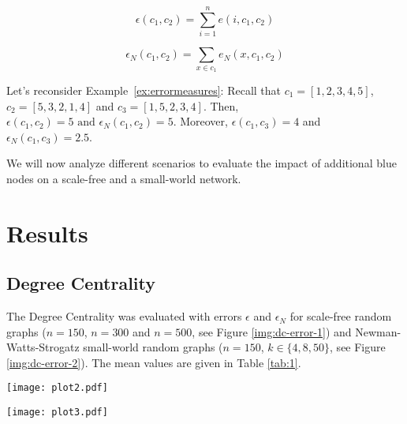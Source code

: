 \[\epsilon(c_1, c_2)= \sum_{i=1}^n e(i,c_1, c_2)\]

\[\epsilon_N(c_1, c_2)= \sum_{x \in c_1} e_N(x,c_1, c_2)\]

\begin{exl}
	Let's reconsider Example~\ref{ex:errormeasures}: 
	Recall that $c_1 = [1,2,3,4,5]$, $c_2=[5,3,2,1,4]$ and $c_3=[1,5,2,3,4]$. 
	Then, $\epsilon(c_1,c_2)=5 \text{ and } \epsilon_{N}(c_1,c_2)=5.$  
	Moreover, $\epsilon(c_1,c_3)=4$ and 
	$\epsilon_{N}(c_1,c_3)=2.5$.
\end{exl}

We will now analyze different scenarios to evaluate the impact of additional blue nodes on a scale-free and a small-world network.

\section{Results}

\subsection{Degree Centrality}

The Degree Centrality was evaluated with errors $\epsilon$ and $\epsilon_N$ for scale-free random graphs ($n=150$, $n=300$ and $n=500$, see Figure \ref{img:dc-error-1}) and Newman-Watts-Strogatz small-world random graphs ($n=150$, $k\in\{4,8,50\}$, see Figure \ref{img:dc-error-2}). The mean values are given in Table \ref{tab:1}.

\begin{figure*}[t] %
	\centering
	\texttt{[image: plot2.pdf]}
	\caption{Degree Centrality errors for scale-free random graphs ($n=150$, $n=300$ and $n=500$) for different values of $p_B$ between 0 and~0.3. }

	\label{img:dc-error-1}

	\centering
	\texttt{[image: plot3.pdf]}
	\caption{Degree Centrality errors for Newman-Watts-Strogatz small-world random graph ($n=150$, $k\in\{4,8,50\}$) for different values of $p_B$ between 0 and~0.3. }

	\label{img:dc-error-2}
\end{figure*}

